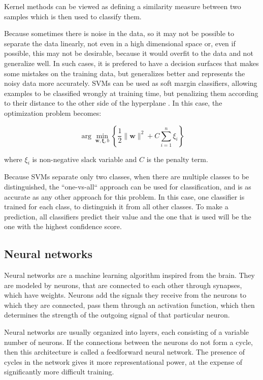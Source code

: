 Kernel methods can be viewed as defining a similarity measure between two samples which is then used to classify them. \cite{Vert}

Because sometimes there is noise in the data, so it may not be possible to separate the data linearly, not even in a high dimensional space or, even if possible, this may not be desirable, because it would overfit to the data and not generalize well. In such cases, it is prefered to have a decision surfaces that makes some mistakes on the training data, but generalizes better and represents the noisy data more accurately. SVMs can be used as soft margin classifiers, allowing examples to be classified wrongly at training time, but penalizing them according to their distance to the other side of the hyperplane \cite{russell1995artificial}. In this case, the optimization problem becomes: 

\[
\arg\min_{\mathbf{w},\mathbf{\xi}, b } \left\{\frac{1}{2} \|\mathbf{w}\|^2 + C \sum_{i=1}^n \xi_i \right\}
\]

where $ \xi_i $ is non-negative slack variable and $ C $ is the penalty term. 

Because SVMs separate only two classes, when there are multiple classes to be distinguished, the ``one-vs-all`` approach can be used for classification, and is as accurate as any other approach for this problem\cite{rifkin2004defense}. In this case, one classifier is trained for each class, to distinguish it from all other classes. To make a prediction, all classifiers predict their value and the one that is used will be the one with the highest confidence score.

\subsection{Neural networks}
Neural networks are a machine learning algorithm inspired from the brain. They are modeled by neurons, that are connected to each other through synapses, which have weights. Neurons add the signals they receive from the neurons to which they are connected, pass them through an activation function, which then determines the strength of the outgoing signal of that particular neuron. 

Neural networks are usually organized into layers, each consisting of a variable number of neurons. If the connections between the neurons do not form a cycle, then this architecture is called a feedforward neural network. The presence of cycles in the network gives it more representational power, at the expense of significantly more difficult training. 



